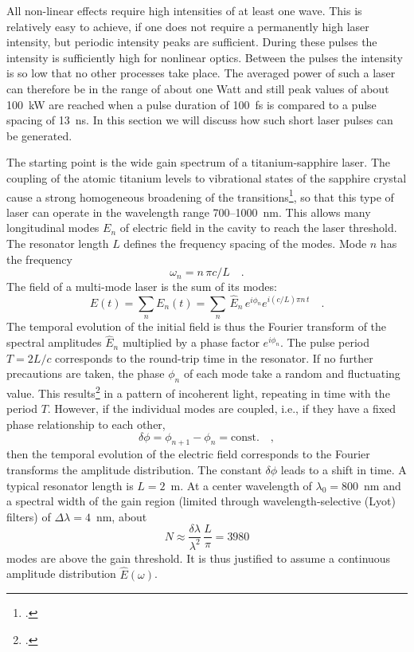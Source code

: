 All non-linear effects  require high
intensities of at least one wave. This 
is relatively
easy to achieve, if one does not require a permanently high laser intensity, but periodic
intensity peaks are sufficient. During these pulses the
intensity  is sufficiently high for nonlinear optics. Between the pulses 
the intensity is so low that no other processes take place. The averaged power of such a laser can therefore
be in the range of about one Watt and still 
peak values of about 100~kW are reached when a pulse duration of
100~fs is compared to a pulse spacing of 13~ns. In
this section we will discuss how such short
laser pulses can be generated.


The starting point is the  wide gain spectrum of a
titanium-sapphire laser. The coupling of the atomic titanium levels to
vibrational states of the sapphire crystal cause a strong
homogeneous broadening of the transitions\footcite[chapter 4]{Rulliere2005}, so that
this type of laser can operate in the wavelength range 700--1000~nm. This allows many longitudinal modes $E_n$  of
electric field in the cavity  to reach the laser threshold. The resonator length $L$ defines the frequency spacing of the
modes. Mode $n$ has the frequency 
\begin{equation}
 \omega_n = n \, \pi c / L \quad.
\end{equation}
The  field of a multi-mode laser is the sum of its
modes:
\begin{equation}
  E(t) = \sum_n E_n(t) = \sum_n \, \hat{E}_n \, e^{i \phi_n} e^{i (c/L) \pi n \, t} \quad .
\end{equation}
The temporal evolution of the initial field is thus  the Fourier transform of the  spectral amplitudes $\hat{E}_n$ multiplied by a phase factor $e^{i \phi_n} $. The pulse period  $T = 2L /c$  corresponds to the round-trip  time in the resonator.
If no further precautions are taken, the
phase $\phi_n$ of each mode take a random  and fluctuating value. This
results\footcite{DielsRudolph1996} in a  pattern of incoherent light, repeating in time with the period $T$.
However, if the individual modes are coupled, i.e., if they 
have a fixed phase relationship to each other,
\begin{equation}
   \delta \phi = \phi_{n+1} - \phi_n = \text{const.} \quad,
   \label{gl_theo_nlo_ml_phiconst}
\end{equation}
then the temporal evolution of the electric field corresponds to the
Fourier transforms the amplitude distribution. The constant
$\delta \phi$ leads to a shift in  time. A typical resonator length is $L = 2$~m. At
a center wavelength of $\lambda_0 = 800$~nm and a
spectral width of the gain region (limited through 
wavelength-selective  (Lyot) filters) of $\Delta \lambda =
4$~nm, about
\begin{equation}
 N \approx \frac{\delta \lambda}{ \lambda^2} \, \frac{L}{\pi} =
 3980
\end{equation}
modes are above the gain threshold. It is thus justified to assume  a
continuous amplitude distribution $\hat{E}(\omega)$.

